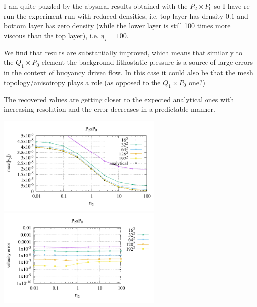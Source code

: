 \newpage

I am quite puzzled by the abysmal results obtained with the $P_2\times P_0$ so I have re-run 
the experiment run with reduced densities, i.e. 
top layer has density $0.1$ and bottom layer has zero density (while the lower layer is still 100
times more viscous than the top layer), i.e. $\eta_\star=100$.

We find that results are substantially improved, which means that similarly to the $Q_1\times P_0$ element
the background lithostatic pressure is a source of large errors in the context of buoyancy driven flow.
In this case it could also be that the mesh topology/anisotropy plays a role 
(as opposed to the $Q_1\times P_0$ one?).

The recovered values are getting closer to the expected analytical ones with increasing resolution
and the error decreases in a predictable manner. 
\begin{center}
\includegraphics[width=8cm]{python_codes/fieldstone_120/paperresults/rt/structured/reduced/rt_wave_vel_P2P0.pdf}
\includegraphics[width=8cm]{python_codes/fieldstone_120/paperresults/rt/structured/reduced/rt_wave_velerror.pdf}
\end{center}

